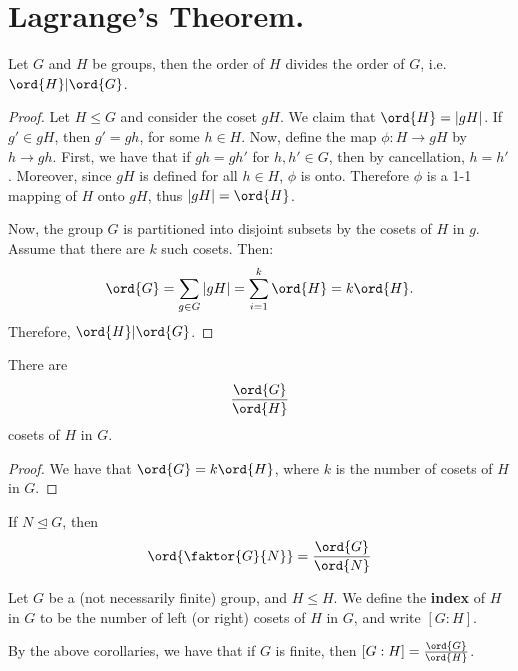 
\section{Lagrange's Theorem.}
\label{section1}

\begin{theorem}\label{3.3.1}
    Let $G$ and  $H$ be groups, then the order of $H$ divides the order of $G$,
    i.e.  $\ord{H}|\ord{G}$.
\end{theorem}
\begin{proof}
    Let $H \leq G$ and consider the coset $gH$. We claim that  $\ord{H}=|gH|$.
    If $g' \in gH$, then  $g'=gh$, for some  $h \in H$. Now, define the map
    $\phi:H \rightarrow gH$ by $h \rightarrow gh$. First, we have that  if
    $gh=gh'$ for  $h,h' \in G$, then by cancellation, $h=h'$. Moreover, since
    $gH$ is defined for all  $h \in H$,  $\phi$ is onto. Therefore  $\phi$ is a
    1-1 mapping of  $H$ onto  $gH$, thus  $|gH|=\ord{H}$.

    Now, the group $G$ is partitioned into disjoint subsets by the cosets of
    $H$ in  $g$. Assume that there are $k$ such cosets. Then:
    \begin{equation*}
        \ord{G}=\sum_{g \in G}{|gH|}=\sum_{i=1}^k{\ord{H}}=k\ord{H}.
    \end{equation*}
    Therefore, $\ord{H}|\ord{G}$.
\end{proof}
\begin{corollary}
    There are
    \begin{equation*}
        \frac{\ord{G}}{\ord{H}}
    \end{equation*}
    cosets of $H$ in  $G$.
\end{corollary}
\begin{proof}
    We have that $\ord{G}=k\ord{H}$, where $k$ is the number of cosets of $H$ in
    $G$.
\end{proof}
\begin{corollary}
    If $N \unlhd G$, then
    \begin{equation}
    \ord{\faktor{G}{N}}=\frac{\ord{G}}{\ord{N}}
    \end{equation}
\end{corollary}

\begin{definition}
    Let $G$ be a (not necessarily finite) group, and  $H \leq H$. We define the
    \textbf{index} of $H$ in $G$ to be the number of left (or right) cosets of
    $H$ in $G$, and write $[G:H]$.
\end{definition}
\begin{remark}
    By the above corollaries, we have that if $G$ is finite, then
    $[G:H]=\frac{\ord{G}}{\ord{H}}$.
\end{remark}


